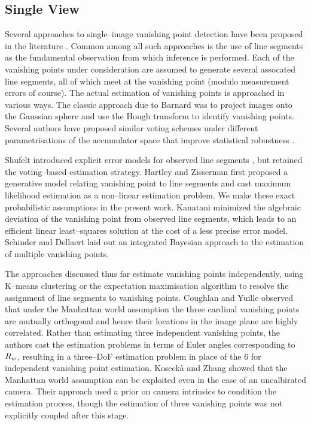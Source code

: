 \subsection{Single View}

Several approaches to single--image vanishing point detection have
been proposed in the literature
\cite{Barnard83,Zhang02,Shufelt99}. Common among all such approaches
is the use of line segments as the fundamental observation from which
inference is performed. Each of the vanishing points under
consideration are assumed to generate several assocated line segments,
all of which meet at the vanishing point (modulo measurement errors of
course). The actual estimation of vanishing points is approached in
various ways. The classic approach due to Barnard \cite{Barnard83} was
to project images onto the Gaussian sphere and use the Hough transform
to identify vanishing points. Several authors have proposed similar
voting schemes under different parametrisations of the accumulator
space that improve statistical robustness \cite{Brillaut91}.

Shufelt introduced explicit error models for observed line segments
\cite{Shufelt99}, but retained the voting--based estimation
strategy. Hartley and Zisserman \cite{Hartley00} first proposed a
generative model relating vanishing point to line segments and cast
maximum likelihood estimation as a non--linear estimation problem. We
make these exact probabilistic assumptions in the present
work. Kanatani \cite{Kanatani93} minimized the algebraic deviation of
the vanishing point from observed line segments, which leads to an
efficient linear least--squares solution at the cost of a less precise
error model. Schinder and Dellaert \cite{Schindler04} laid out an
integrated Bayesian approach to the estimation of multiple vanishing
points.

The approaches discussed thus far estimate vanishing points
independently, using K--means clustering or the expectation
maximisation algorithm to resolve the assignment of line segments to
vanishing points. Coughlan and Yuille \cite{Coughlan99} observed that
under the Manhattan world assumption the three cardinal vanishing
points are mutually orthogonal and hence their locations in the image
plane are highly correlated. Rather than estimating three independent
vanishing points, the authors cast the estimation problems in terms of
Euler angles corresponding to $\SceneR$, resulting in a three--DoF
estimation problem in place of the 6 for independent vanishing point
estimation. Koseck\`{a} and Zhang \cite{Zhang02} showed that the
Manhattan world assumption can be exploited even in the case of an
uncalbirated camera. Their approach used a prior on camera intrinsics
to condition the estimation process, though the estimation of three
vanishing points was not explicitly coupled after this stage.

